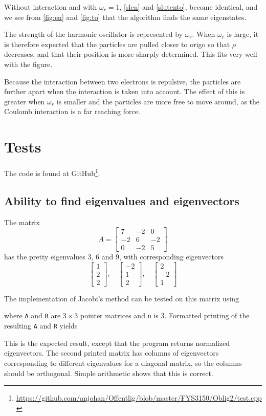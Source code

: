 \documentclass[12pt,english,a4paper]{report}
\begin{document}
Without interaction and with \(\omega_r=1\), \ref{slen} and \ref{slutento}, become identical, and we see from \vref{fig:en} and \vref{fig:to} that the algorithm finds the same eigenstates.

The strength of the harmonic oscillator is represented by \(\omega_r\). When \(\omega_r\) is large, it is therefore expected that the particles are pulled closer to origo so that \(\rho\) decreases, and that their position is more sharply determined. This fits very well with the figure.

Because the interaction between two electrons is repulsive, the particles are further apart when the interaction is taken into account. The effect of this is greater when \(\omega_r\) is smaller and the particles are more free to move around, as the Coulomb interaction is a far reaching force.

%

\section{Tests}
The code is found at GitHub\footnote{\url{https://github.com/anjohan/Offentlig/blob/master/FYS3150/Oblig2/test.cpp}}.
\subsection{Ability to find eigenvalues and eigenvectors}
The matrix
\[
A = \begin{bmatrix}7 & -2 & 0\\ -2 & 6 & -2\\ 0 & -2 & 5\end{bmatrix}
\]
has the pretty eigenvalues \(3\), \(6\) and \(9\), with corresponding eigenvectors
\[
\begin{bmatrix}1 \\ 2 \\ 2\end{bmatrix},\quad
\begin{bmatrix}-2 \\ 1 \\ 2\end{bmatrix}, \quad
\begin{bmatrix}2 \\ -2 \\ 1\end{bmatrix}
\]

The implementation of Jacobi's method can be tested on this matrix using

where \texttt{A} and \texttt{R} are \(3\times3\) pointer matrices and \texttt{n} is \(3\). Formatted printing of the resulting \texttt{A} and \texttt{R} yields

This is the expected result, except that the program returns normalized eigenvectors. The second printed matrix has columns of eigenvectors corresponding to different eigenvalues for a diagonal matrix, so the columns should be orthogonal. Simple arithmetic shows that this is correct.
\end{document}
